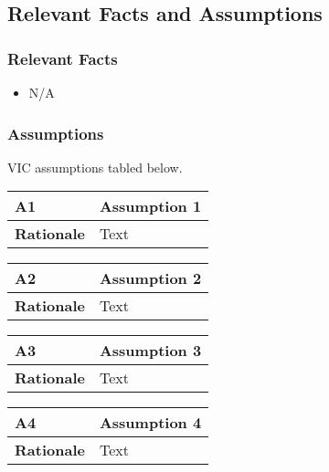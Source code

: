 \documentclass [11pt]{article}
\begin{document}
\subsection{Relevant Facts and Assumptions} 

\subsubsection{Relevant Facts}
\begin{itemize}
	\item N/A
\end{itemize}

\subsubsection{Assumptions}
VIC assumptions tabled below. 
\begin{longtable}{| p{ } | p{ } | }\hline 
\rowcolor{tableCell}\textbf{A1} & Assumption 1 \\ \hline
\textbf{Rationale} & Text \\ \hline 
\end{longtable}

\begin{longtable}{| p{ } | p{ } | }\hline 
\rowcolor{tableCell}\textbf{A2} & Assumption 2 \\ \hline
\textbf{Rationale} &  Text\\ \hline
\end{longtable}

\begin{longtable}{| p{ } | p{ } | }\hline 
\rowcolor{tableCell}\textbf{A3} & Assumption 3 \\ \hline
\textbf{Rationale} &  Text \\ \hline
\end{longtable}

\begin{longtable}{| p{ } | p{ } | }\hline 
\rowcolor{tableCell}\textbf{A4} &Assumption 4 \\ \hline
\textbf{Rationale} &  Text\\ \hline
\end{longtable}

\end{document}
